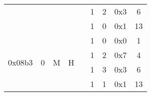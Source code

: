 \documentclass[11pt]{homework}
\newcommand{\xmark}{\ding{55}}%
\begin{document}
\begin{arabicparts}
{\begin{tabular}{|c|c|c|c|c|c|c|c|c|}
            \cline{6-9}
                                     &                                                                        &                                                                   &                                                                    &                                                                      & 1                        & 2         & 0x3 & 6             \\
            \cline{6-9}
                                     &                                                                        &                                                                   &                                                                    &                                                                      & 1                        & 0         & 0x1 & 13            \\
            \hline
            \multirow{4}{*}{0x08b3}  & \multirow{4}{*}{0}                                                     & \multirow{4}{*}{M}                                                & \multirow{4}{*}{H}                                                 & \multirow{4}{*}{\xmark}                                              & 1                        & 0         & 0x0 & 1             \\
            \cline{6-9}
                                     &                                                                        &                                                                   &                                                                    &                                                                      & 1                        & 2         & 0x7 & 4             \\
            \cline{6-9}
                                     &                                                                        &                                                                   &                                                                    &                                                                      & 1                        & 3         & 0x3 & 6             \\
            \cline{6-9}
                                     &                                                                        &                                                                   &                                                                    &                                                                      & 1                        & 1         & 0x1 & 13            \\

\end{tabular}}
\end{arabicparts}
\end{document}
